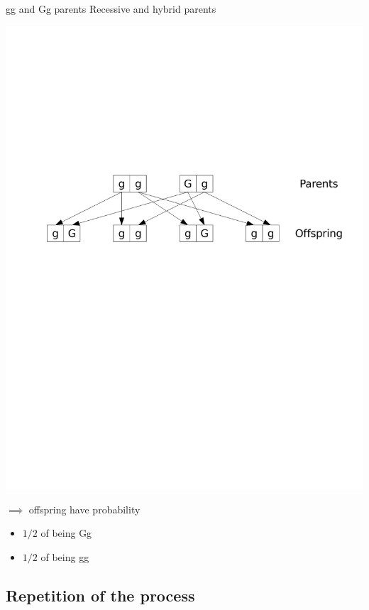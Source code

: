 \documentclass[aspectratio=169]{beamer}\usepackage[]{graphicx}\usepackage[]{xcolor}
\begin{document}
\begin{frame}{gg and Gg parents}
Recessive and hybrid parents
\vfill
\begin{center}
	\includegraphics[width=\textwidth]{FIGS_slides/recessive_hybrid}
\end{center}
\vfill
$\implies$ offspring have probability 
\begin{itemize}
\item $1/2$ of being Gg 
\item $1/2$ of being gg
\end{itemize}
\end{frame}




\subsection{Repetition of the process}
\end{document}
